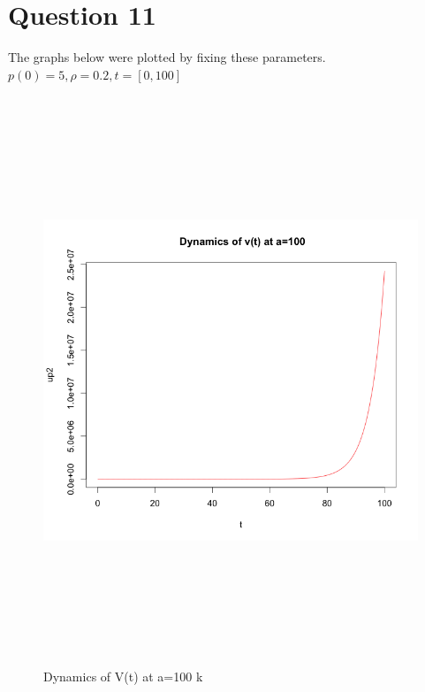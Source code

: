 \documentclass[12pt]{article}
\numberwithin{equation}{subsection} %
\begin{document}
\section{Question 11}
The graphs below were plotted by fixing these parameters.\\
$p(0)=5, \rho=0.2,t=[0,100]$
\begin{figure}[ht!]
\centering
\includegraphics[width=170mm,height=170mm]{11.png}
\caption{ Dynamics of V(t) at a=100 k\label{overflow}}
\end{figure}
\newpage
\end{document}
